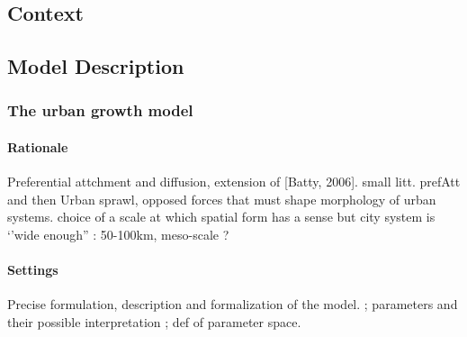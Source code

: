 \subsection{Context}




\subsection{Model Description}



\subsubsection{The urban growth model}

\paragraph{Rationale}

Preferential attchment and diffusion, extension of [Batty, 2006]. small litt. prefAtt and then Urban sprawl, opposed forces that must shape morphology of urban systems. choice of a scale at which spatial form has a sense but city system is ‘’wide enough” : 50-100km, meso-scale ?



\paragraph{Settings}

Precise formulation, description and formalization of the model. ; parameters and their possible interpretation ; def of parameter space.





